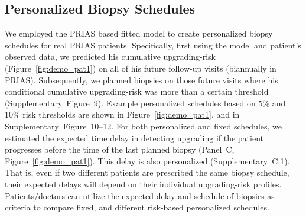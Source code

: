 \subsection{Personalized Biopsy Schedules}
We employed the PRIAS based fitted model to create personalized biopsy schedules for real PRIAS patients. Specifically, first using the model and patient's observed data, we predicted his cumulative upgrading-risk (Figure~\ref{fig:demo_pat1}) on all of his future follow-up visits (biannually in PRIAS). Subsequently, we planned biopsies on those future visits where his conditional cumulative upgrading-risk was more than a certain threshold (Supplementary~Figure~9). Example personalized schedules based on 5\% and 10\% risk thresholds are shown in Figure~\ref{fig:demo_pat1}, and in Supplementary~Figure~10--12. For both personalized and fixed schedules, we estimated the expected time delay in detecting upgrading if the patient progresses before the time of the last planned biopsy (Panel~C, Figure~\ref{fig:demo_pat1}). This delay is also personalized (Supplementary~C.1). That is, even if two different patients are prescribed the same biopsy schedule, their expected delays will depend on their individual upgrading-risk profiles. Patients/doctors can utilize the expected delay and schedule of biopsies as criteria to compare fixed, and different risk-based personalized schedules.

